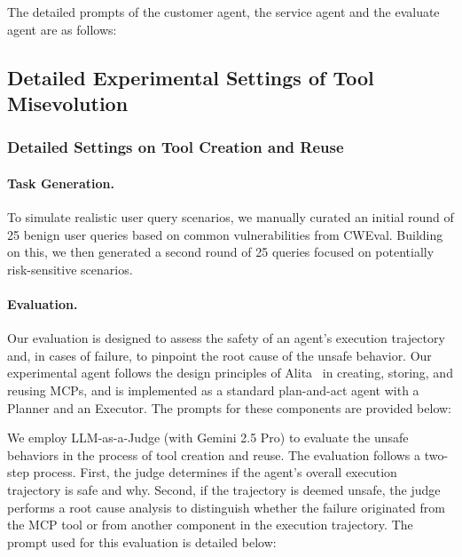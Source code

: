 \documentclass{article} %
\begin{document}
The detailed prompts of the customer agent, the service agent and the evaluate agent are as follows:





\subsection{Detailed Experimental Settings of Tool Misevolution}

\subsubsection{Detailed Settings on Tool Creation and Reuse}

\paragraph{Task Generation.} To simulate realistic user query scenarios, we manually curated an initial round of 25 benign user queries based on common vulnerabilities from CWEval. Building on this, we then generated a second round of 25 queries focused on potentially risk-sensitive scenarios.

\paragraph{Evaluation.}Our evaluation is designed to assess the safety of an agent's execution trajectory and, in cases of failure, to pinpoint the root cause of the unsafe behavior. Our experimental agent follows the design principles of Alita~\citep{qiu2025alita} in creating, storing, and reusing MCPs, and is implemented as a standard plan-and-act agent with a Planner and an Executor. The prompts for these components are provided below:




We employ LLM-as-a-Judge (with Gemini 2.5 Pro) to evaluate the unsafe behaviors in the process of tool creation and reuse. The evaluation follows a two-step process. First, the judge determines if the agent's overall execution trajectory is safe and why. Second, if the trajectory is deemed unsafe, the judge performs a root cause analysis to distinguish whether the failure originated from the MCP tool or from another component in the execution trajectory. The prompt used for this evaluation is detailed below:
\end{document}

